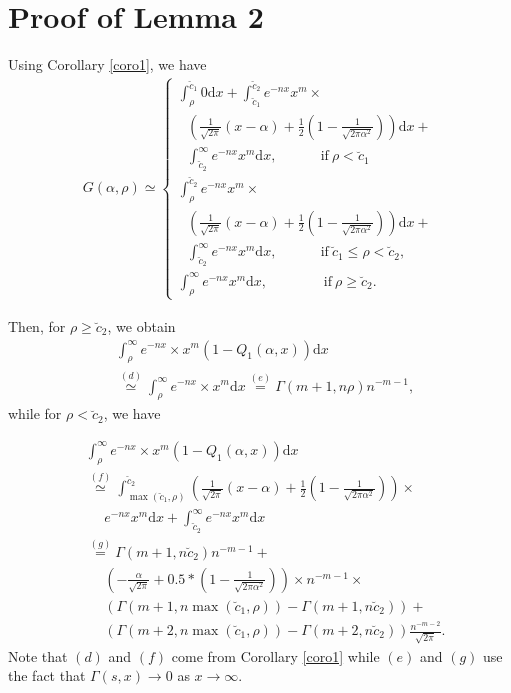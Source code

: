\appendix
\renewcommand{\thesection}{\Alph{section}}
\section{Proof of Lemma 2}
  \label{proof_Lemma2}
Using Corollary \ref{coro1},  we have
\begin{align}
G(\alpha,\rho)\simeq
\begin{cases}
\int_\rho^{\breve{c}_1}0\text{d}x + \int_{\breve{c}_1}^{\breve{c}_2}e^{-nx}x^{m}\times\nonumber\\
~~~\left(\frac{1}{\sqrt{2\pi}}(x-\alpha) + \frac{1}{2}\left(1-\frac{1}{\sqrt{2\pi\alpha^2}}\right)\right)\text{d}x +\nonumber\\
~~~\int_{\breve{c}_2}^{\infty}e^{-nx}x^{m}\text{d}x, ~~~~~~~~~~~~~~\mathrm{if}~  \rho < \breve{c}_1  \\ 
 \int_{\rho}^{\breve{c}_2}e^{-nx}x^{m}\times\nonumber\\
~~~\left(\frac{1}{\sqrt{2\pi}}(x-\alpha) + \frac{1}{2}\left(1-\frac{1}{\sqrt{2\pi\alpha^2}}\right)\right)\text{d}x +\nonumber\\
~~~\int_{\breve{c}_2}^{\infty}e^{-nx}x^{m}\text{d}x, ~~~~~~~~~~~~~~\mathrm{if}~  \breve{c}_1\leq\rho<\breve{c}_2,\nonumber\\
\int_\rho^{\infty} e^{-nx}x^{m}\text{d}x, ~~~~~~~~~~~~~~~~~~\mathrm{if}~  \rho\geq\breve{c}_2.
\end{cases}
\end{align}


Then, for $\rho\geq \breve{c}_2$, we obtain
\begin{align}
&    \int_\rho^\infty e^{-nx}\times x^{m}(1-Q_1(\alpha,x))\text{d}x\nonumber\\
  &  \overset{(d)}\simeq\int_\rho^\infty e^{-nx}\times x^{m}\text{d}x
   \overset{(e)}= \Gamma(m+1,n\rho)n^{-m-1}, 
\end{align}
while for $\rho<\breve{c}_2$, we have

\begin{align}
 &  \int_\rho^\infty e^{-nx}\times x^{m}(1-Q_1(\alpha,x))\text{d}x\nonumber\\
&    \overset{(f)}\simeq \int_{\max(\breve{c}_1,\rho)}^{\breve{c}_2} \left(\frac{1}{\sqrt{2\pi}}(x-\alpha) + 
\frac{1}{2}\left(1-\frac{1}{\sqrt{2\pi\alpha^2}}\right)\right)\times\nonumber\\
& ~~~~~~e^{-nx}x^{m}\text{d}x +\int_{\breve{c}_2}^\infty e^{-nx} x^{m}\text{d}x\nonumber\\
& \overset{(g)}= \Gamma(m+1,n\breve{c}_2)n^{-m-1} + \nonumber\\
&~~~~~~\left(-\frac{\alpha}{\sqrt{2\pi}}+0.5*\left(1-\frac{1}{\sqrt{2\pi\alpha^2}}\right)\right)\times n^{-m-1}\times\nonumber\\
&~~~~~~\left(\Gamma\left(m+1,n\max(\breve{c}_1,\rho)\right)-\Gamma\left(m+1,n\breve{c}_2\right)\right)+\nonumber\\
&~~~~~~\left(\Gamma(m+2,n\max(\breve{c}_1,\rho))-\Gamma(m+2,n\breve{c}_2)\right)\frac{n^{-m-2}}{\sqrt{2\pi}}.
\end{align}
Note that $(d)$ and $(f)$ come from Corollary \ref{coro1} while $(e)$ and $(g)$ use the fact that $\Gamma(s,x)\rightarrow 0$ as $x\rightarrow\infty$.


